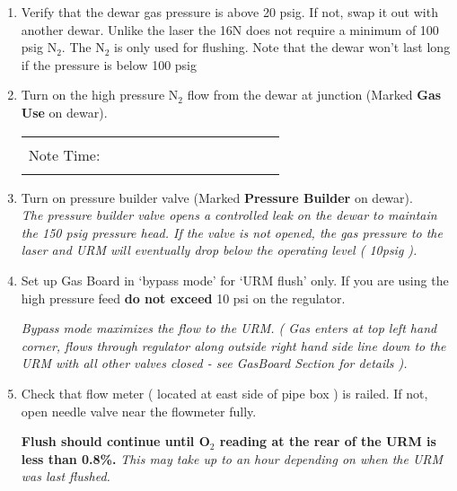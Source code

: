 \begin{enumerate}
\item \checkbox Verify that the dewar gas pressure is above
  20 psig. If not, swap it out with another dewar. Unlike the laser the 16N
does not require a minimum of 100 psig N$_2$. The N$_2$ is only used for flushing.
Note that the dewar won't last long if the pressure is below 100 psig

\item \checkbox Turn on the high pressure N$_2$ flow from the dewar at junction 
  (Marked {\bf Gas Use} on dewar).
     \begin{center}
     \begin{tabular}{|l|}
     \hline
      \\
     Note Time:~~~~~~~~~~~~~~~~~~~~~~~~\\
      \\
     \hline
     \end{tabular}
     \end{center}

\item \checkbox Turn on pressure builder valve (Marked {\bf Pressure Builder} 
  on dewar).\\
  \small
  {\em The pressure builder valve opens a controlled leak on the dewar
       to maintain the 150 psig pressure head.  If the valve is not
       opened, the gas pressure to the laser and URM will eventually
       drop below the operating level ( 10psig ). }
  \normalsize



\item\checkbox Set up Gas Board in `bypass mode' for `URM flush' only. If you are
using the high pressure feed {\bf do not exceed } 10 psi on the regulator.
  \small
  {\em Bypass mode maximizes the flow to the URM. ( Gas enters at top left hand corner,
flows through regulator along outside right hand side line
down to the URM with all other valves closed - see GasBoard Section for details ).

  }
  \normalsize

\item\checkbox Check that flow meter ( located at east side of
pipe box ) is railed. If not, open needle valve near the flowmeter fully.

   {\bf Flush should continue until O$_2$ reading at the rear of the URM is less than 0.8\%.}
   \small
   {\em
     This may take up to an hour depending on when the URM was last
     flushed.
   }
   \normalsize




\end{enumerate}
